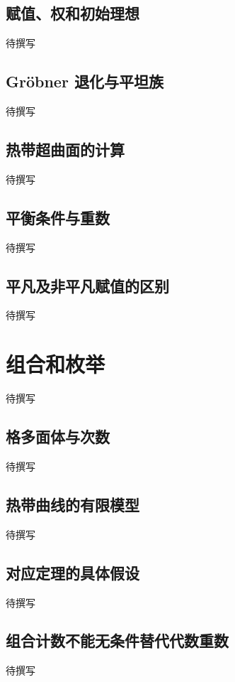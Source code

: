 \subsection{赋值、权和初始理想}
\label{g5:subsec:C02:01}
待撰写

\subsection{Gröbner 退化与平坦族}
\label{g5:subsec:C02:02}
待撰写

\subsection{热带超曲面的计算}
\label{g5:subsec:C02:03}
待撰写

\subsection{平衡条件与重数}
\label{g5:subsec:C02:04}
待撰写

\subsection{平凡及非平凡赋值的区别}
\label{g5:subsec:C02:05}
待撰写

\section{组合和枚举}
\label{g5:sec:C03}
待撰写

\subsection{格多面体与次数}
\label{g5:subsec:C03:01}
待撰写

\subsection{热带曲线的有限模型}
\label{g5:subsec:C03:02}
待撰写

\subsection{对应定理的具体假设}
\label{g5:subsec:C03:03}
待撰写

\subsection{组合计数不能无条件替代代数重数}
\label{g5:subsec:C03:04}
待撰写
